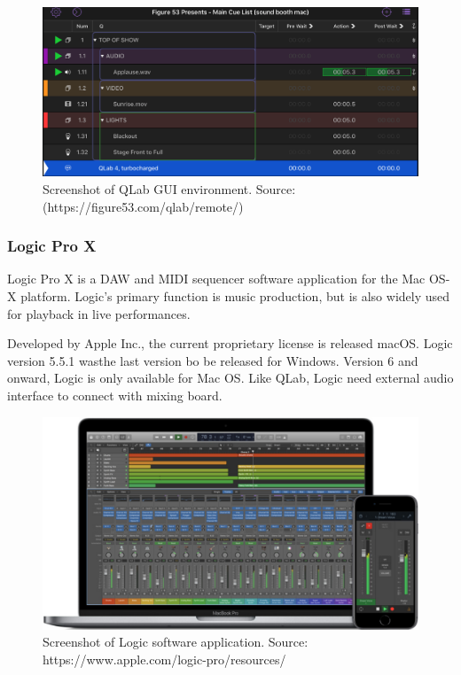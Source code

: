 \begin{figure}[H]
\centering
\includegraphics[scale=0.8]{./pictures/qlab.png}
\caption{Screenshot of QLab GUI environment. Source: (https://figure53.com/qlab/remote/)}
\label{fig:qlab.png}
\end{figure}

\subsubsection{Logic Pro X}
Logic Pro X is a DAW and MIDI sequencer software application for the Mac OS-X platform. Logic's primary function is music production, but is also widely used for playback in live performances. \newline

Developed by Apple Inc., the current proprietary license is released macOS. Logic version 5.5.1 wasthe last version bo be released for Windows. Version 6 and onward, Logic is only available for Mac OS. Like QLab, Logic need external audio interface to connect with mixing board. \\
 
\begin{figure}[H]
\centering
\includegraphics[scale=0.4]{./pictures/logic.png}
\caption{Screenshot of Logic software application. Source: https://www.apple.com/logic-pro/resources/}
\label{fig:logic.png}
\end{figure}

